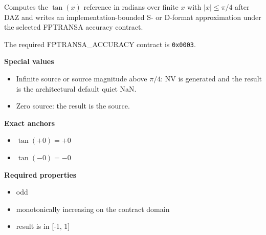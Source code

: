 Computes the $\tan(x)$ reference in radians over finite $x$ with $|x| \le \pi/4$ after DAZ and writes an implementation-bounded S- or D-format approximation under the selected FPTRANSA accuracy contract.

The required FPTRANSA\_ACCURACY contract is \texttt{0x0003}.

\textbf{Special values}\par
\begin{itemize}
\item Infinite source or source magnitude above $\pi/4$: NV is generated and the result is the architectural default quiet NaN.
\item Zero source: the result is the source.
\end{itemize}

\textbf{Exact anchors}\par
\begin{itemize}
\item $\tan(+0) = +0$
\item $\tan(-0) = -0$
\end{itemize}

\textbf{Required properties}\par
\begin{itemize}
\item odd
\item monotonically increasing on the contract domain
\item result is in [-1, 1]
\end{itemize}
